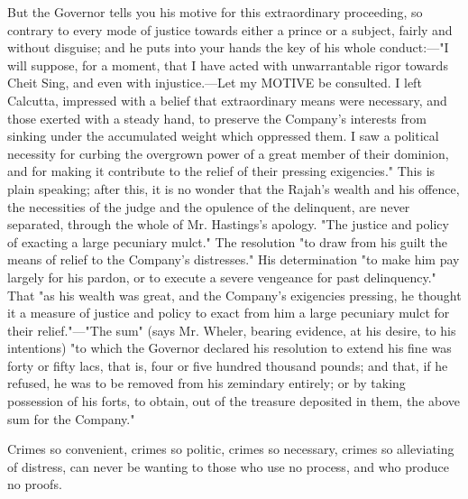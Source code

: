 But the Governor tells you his motive for this extraordinary proceeding, so contrary to every mode of justice towards either a prince or a subject, fairly and without disguise; and he puts into your hands the key of his whole conduct:—"I will suppose, for a moment, that I have acted with unwarrantable rigor towards Cheit Sing, and even with injustice.—Let my MOTIVE be consulted. I left Calcutta, impressed with a belief that extraordinary means were necessary, and those exerted with a steady hand, to preserve the Company's interests from sinking under the accumulated weight which oppressed them. I saw a political necessity for curbing the overgrown power of a great member of their dominion, and for making it contribute to the relief of their pressing exigencies." This is plain speaking; after this, it is no wonder that the Rajah's wealth and his offence, the necessities of the judge and the opulence of the delinquent, are never separated, through the whole of Mr. Hastings's apology. "The justice and policy of exacting a large pecuniary mulct." The resolution "to draw from his guilt the means of relief to the Company's distresses." His determination "to make him pay largely for his pardon, or to execute a severe vengeance for past delinquency." That "as his wealth was great, and the Company's exigencies pressing, he thought it a measure of justice and policy to exact from him a large pecuniary mulct for their relief."—"The sum" (says Mr. Wheler, bearing evidence, at his desire, to his intentions) "to which the Governor declared his resolution to extend his fine was forty or fifty lacs, that is, four or five hundred thousand pounds; and that, if he refused, he was to be removed from his zemindary entirely; or by taking possession of his forts, to obtain, out of the treasure deposited in them, the above sum for the Company."

Crimes so convenient, crimes so politic, crimes so necessary, crimes so alleviating of distress, can never be wanting to those who use no process, and who produce no proofs.

